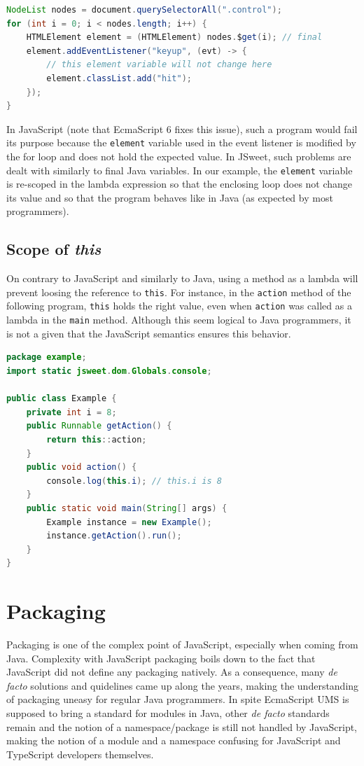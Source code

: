 \documentclass[a4paper]{report}
\begin{document}
\begin{lstlisting}[language=Java]
NodeList nodes = document.querySelectorAll(".control");
for (int i = 0; i < nodes.length; i++) {
	HTMLElement element = (HTMLElement) nodes.$get(i); // final
	element.addEventListener("keyup", (evt) -> {
	    // this element variable will not change here 
		element.classList.add("hit");
	});
}
\end{lstlisting}

In JavaScript (note that EcmaScript 6 fixes this issue), such a program would fail its purpose because the \texttt{element} variable used in the event listener is modified by the for loop and does not hold the expected value. In JSweet, such problems are dealt with similarly to final Java variables. In our example, the \texttt{element} variable is re-scoped in the lambda expression so that the enclosing loop does not change its value and so that the program behaves like in Java (as expected by most programmers).

\section{Scope of \emph{this}}

On contrary to JavaScript and similarly to Java, using a method as a lambda will prevent loosing the reference to \texttt{this}. For instance, in the \texttt{action} method of the following program, \texttt{this} holds the right value, even when \texttt{action} was called as a lambda in the \texttt{main} method. Although this seem logical to Java programmers, it is not a given that the JavaScript semantics ensures this behavior. 

\begin{lstlisting}[language=Java]
package example;
import static jsweet.dom.Globals.console;

public class Example {
	private int i = 8;
	public Runnable getAction() {
		return this::action;
	}
	public void action() {
		console.log(this.i); // this.i is 8
	}
	public static void main(String[] args) {
		Example instance = new Example();
		instance.getAction().run();
	}
}
\end{lstlisting}

\chapter{Packaging}
\label{packaging}

Packaging is one of the complex point of JavaScript, especially when coming from Java. Complexity with JavaScript packaging boils down to the fact that JavaScript did not define any packaging natively. As a consequence, many \emph{de facto} solutions and quidelines came up along the years, making the understanding of packaging uneasy for regular Java programmers. In spite EcmaScript UMS is supposed to bring a standard for modules in Java, other \emph{de facto} standards remain and the notion of a namespace/package is still not handled by JavaScript, making the notion of a module and a namespace confusing for JavaScript and TypeScript developers themselves.
\end{document}
